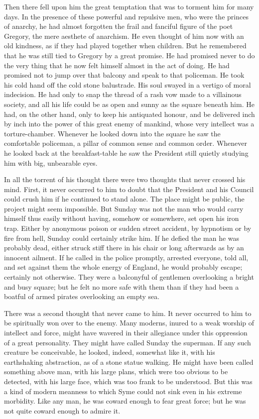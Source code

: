 Then there fell upon him the great temptation that was to torment him for many days. In the presence of these powerful and repulsive men, who were the princes of anarchy, he had almost forgotten the frail and fanciful figure of the poet Gregory, the mere aesthete of anarchism. He even thought of him now with an old kindness, as if they had played together when children. But he remembered that he was still tied to Gregory by a great promise. He had promised never to do the very thing that he now felt himself almost in the act of doing. He had promised not to jump over that balcony and speak to that policeman. He took his cold hand off the cold stone balustrade. His soul swayed in a vertigo of moral indecision. He had only to snap the thread of a rash vow made to a villainous society, and all his life could be as open and sunny as the square beneath him. He had, on the other hand, only to keep his antiquated honour, and be delivered inch by inch into the power of this great enemy of mankind, whose very intellect was a torture-chamber. Whenever he looked down into the square he saw the comfortable policeman, a pillar of common sense and common order. Whenever he looked back at the breakfast-table he saw the President still quietly studying him with big, unbearable eyes.

In all the torrent of his thought there were two thoughts that never crossed his mind. First, it never occurred to him to doubt that the President and his Council could crush him if he continued to stand alone. The place might be public, the project might seem impossible. But Sunday was not the man who would carry himself thus easily without having, somehow or somewhere, set open his iron trap. Either by anonymous poison or sudden street accident, by hypnotism or by fire from hell, Sunday could certainly strike him. If he defied the man he was probably dead, either struck stiff there in his chair or long afterwards as by an innocent ailment. If he called in the police promptly, arrested everyone, told all, and set against them the whole energy of England, he would probably escape; certainly not otherwise. They were a balconyful of gentlemen overlooking a bright and busy square; but he felt no more safe with them than if they had been a boatful of armed pirates overlooking an empty sea.

There was a second thought that never came to him. It never occurred to him to be spiritually won over to the enemy. Many moderns, inured to a weak worship of intellect and force, might have wavered in their allegiance under this oppression of a great personality. They might have called Sunday the superman. If any such creature be conceivable, he looked, indeed, somewhat like it, with his earthshaking abstraction, as of a stone statue walking. He might have been called something above man, with his large plans, which were too obvious to be detected, with his large face, which was too frank to be understood. But this was a kind of modern meanness to which Syme could not sink even in his extreme morbidity. Like any man, he was coward enough to fear great force; but he was not quite coward enough to admire it.

